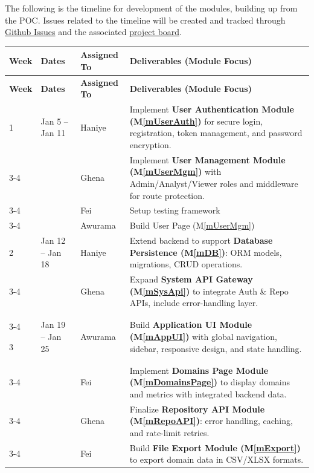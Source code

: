 \documentclass[12pt, titlepage]{article}
\newcommand{\mref}[1]{M\ref{#1}}
\begin{document}
The following is the timeline for development of the modules, building up from the POC. Issues related to the timeline will be created and tracked through \href{https://github.com/thaafei/DomainX/issues}{Github Issues} and the associated \href{https://github.com/users/thaafei/projects/6}{project board}.
\begin{longtable}{|p{1.2cm}|p{2.3cm}|p{3cm}|p{8.2cm}|}
\hline
\textbf{Week} & \textbf{Dates} & \textbf{Assigned To} & \textbf{Deliverables (Module Focus)} \\ \hline
\endfirsthead
\hline
\textbf{Week} & \textbf{Dates} & \textbf{Assigned To} & \textbf{Deliverables (Module Focus)} \\ \hline
\endhead

1 & Jan 5 -- Jan 11 & Haniye & Implement \textbf{User Authentication Module (\mref{mUserAuth})} for secure login, registration, token management, and password encryption. \\ \cline{3-4}
  &  & Ghena & Implement \textbf{User Management Module (\mref{mUserMgm})} with Admin/Analyst/Viewer roles and middleware for route protection. \\ \cline{3-4}
  &  & Fei & Setup testing framework \\ \cline{3-4}
  &  & Awurama & Build User Page (\mref{mUserMgm}) \\ \hline

2 & Jan 12 -- Jan 18 & Haniye & Extend backend to support \textbf{Database Persistence (\mref{mDB})}: ORM models, migrations, CRUD operations. \\ \cline{3-4}
  &  & Ghena & Expand \textbf{System API Gateway (\mref{mSysApi})} to integrate Auth \& Repo APIs, include error-handling layer. \\ \cline{3-4}

3 & Jan 19 -- Jan 25 & Awurama & Build \textbf{Application UI Module (\mref{mAppUI})} with global navigation, sidebar, responsive design, and state handling. \\ \cline{3-4}
  &  & Fei & Implement \textbf{Domains Page Module (\mref{mDomainsPage})} to display domains and metrics with integrated backend data. \\ \cline{3-4}
  &  & Ghena & Finalize \textbf{Repository API Module (\mref{mRepoAPI})}: error handling, caching, and rate-limit retries. \\ \cline{3-4}
  &  & Fei & Build \textbf{File Export Module (\mref{mExport})} to export domain data in CSV/XLSX formats. \\ \hline


\end{longtable}
\end{document}
